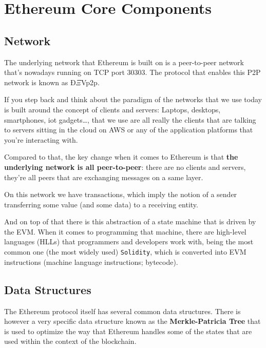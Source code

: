 \section{Ethereum Core Components}\label{ethereum-core-components}

\subsection{Network}\label{network}

The underlying network that Ethereum is built on is a peer-to-peer
network that's nowadays running on TCP port 30303. The protocol that
enables this P2P network is known as Ð$\Xi$Vp2p.

If you step back and think about the paradigm of the networks that we
use today is built around the concept of clients and servers: Laptops,
desktops, smartphones, iot gadgets\ldots, that we use are all really the
clients that are talking to servers sitting in the cloud on AWS or any
of the application platforms that you're interacting with.

Compared to that, the key change when it comes to Ethereum is that
\textbf{the underlying network is all peer-to-peer}: there are no
clients and servers, they're all peers that are exchanging messages on a
same layer.

On this network we have transactions, which imply the notion of a sender
transferring some value (and some data) to a receiving entity.

And on top of that there is this abstraction of a state machine that is
driven by the EVM. When it comes to programming that machine, there are
high-level languages (HLLs) that programmers and developers work with,
being the most common one (the most widely used) \texttt{Solidity},
which is converted into EVM instructions (machine language instructions;
bytecode).

\subsection{Data Structures}\label{data-structures}

The Ethereum protocol itself has several common data structures. There
is however a very specific data structure known as the
\textbf{Merkle-Patricia Tree} that is used to optimize the way that
Ethereum handles some of the states that are used within the context of
the blockchain.

